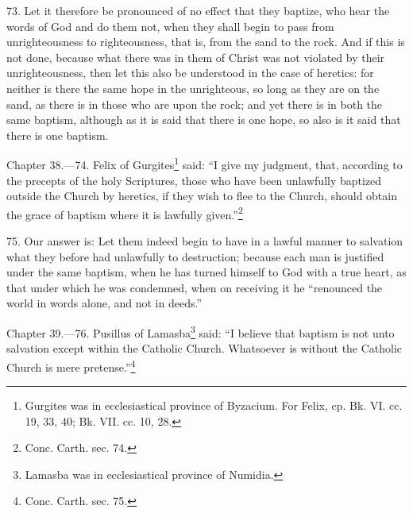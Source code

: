 73. Let it therefore be pronounced of no effect that they baptize, who hear the words of God and do them not, when they shall begin to pass from unrighteousness to righteousness, that is, from the sand to the rock. And if this is not done, because what there was in them of Christ was not violated by their unrighteousness, then let this also be understood in the case of heretics: for neither is there the same hope in the unrighteous, so long as they are on the sand, as there is in those who are upon the rock; and yet there is in both the same baptism, although as it is said that there is one hope, so also is it said that there is one baptism.


Chapter 38.—74. Felix of Gurgites\footnote{\par  Gurgites was in ecclesiastical province of Byzacium. For Felix, cp. Bk. VI. cc. 19, 33, 40; Bk. VII. cc. 10, 28.} said: ``I give my judgment, that, according to the precepts of the holy Scriptures, those who have been unlawfully baptized outside the Church by heretics, if they wish to flee to the Church, should obtain the grace of baptism where it is lawfully given.''\footnote{\par  Conc. Carth. sec. 74.}

75. Our answer is: Let them indeed begin to have in a lawful manner to salvation what they before had unlawfully to destruction; because each man is justified under the same baptism, when he has turned himself to God with a true heart, as that under which he was condemned, when on receiving it he ``renounced the world in words alone, and not in deeds.''


Chapter 39.—76. Pusillus of Lamasba\footnote{\par  Lamasba was in ecclesiastical province of Numidia.} said: ``I believe that baptism is not unto salvation except within the Catholic Church. Whatsoever is without the Catholic Church is mere pretense.''\footnote{\par  Conc. Carth. sec. 75.}

